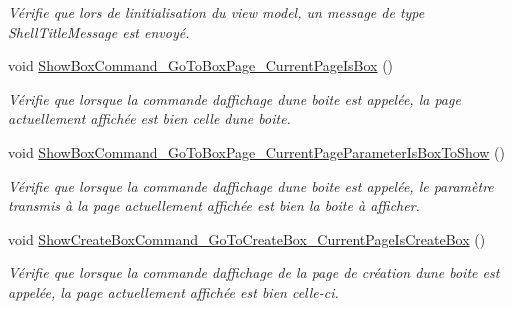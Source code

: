 \begin{DoxyCompactItemize}
\begin{DoxyCompactList}\small\item\em Vérifie que lors de l\textquotesingle{}initialisation du view model, un message de type Shell\+Title\+Message est envoyé. \end{DoxyCompactList}\item 
void \hyperlink{class_boxes_1_1_tests_1_1_my_boxes_view_model_tests_ab2e4389722625146942c82234eb277b7}{Show\+Box\+Command\+\_\+\+Go\+To\+Box\+Page\+\_\+\+Current\+Page\+Is\+Box} ()
\begin{DoxyCompactList}\small\item\em Vérifie que lorsque la commande d\textquotesingle{}affichage d\textquotesingle{}une boite est appelée, la page actuellement affichée est bien celle d\textquotesingle{}une boite. \end{DoxyCompactList}\item 
void \hyperlink{class_boxes_1_1_tests_1_1_my_boxes_view_model_tests_ae3dc27b9be2583e47b38f5a7c61b852d}{Show\+Box\+Command\+\_\+\+Go\+To\+Box\+Page\+\_\+\+Current\+Page\+Parameter\+Is\+Box\+To\+Show} ()
\begin{DoxyCompactList}\small\item\em Vérifie que lorsque la commande d\textquotesingle{}affichage d\textquotesingle{}une boite est appelée, le paramètre transmis à la page actuellement affichée est bien la boite à afficher. \end{DoxyCompactList}\item 
void \hyperlink{class_boxes_1_1_tests_1_1_my_boxes_view_model_tests_a77e31f3f26d7f9ce07c17d46bfb34e6a}{Show\+Create\+Box\+Command\+\_\+\+Go\+To\+Create\+Box\+\_\+\+Current\+Page\+Is\+Create\+Box} ()
\begin{DoxyCompactList}\small\item\em Vérifie que lorsque la commande d\textquotesingle{}affichage de la page de création d\textquotesingle{}une boite est appelée, la page actuellement affichée est bien celle-\/ci. \end{DoxyCompactList}\end{DoxyCompactItemize}
